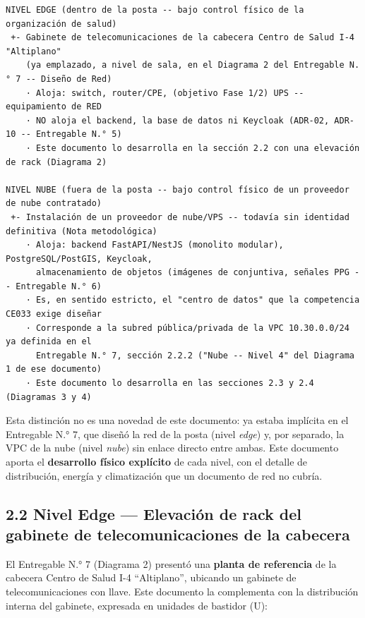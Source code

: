 \documentclass[11pt,a4paper]{article}
\begin{document}
\begin{samepage}\begin{verbatim}
NIVEL EDGE (dentro de la posta -- bajo control físico de la organización de salud)
 +- Gabinete de telecomunicaciones de la cabecera Centro de Salud I-4 "Altiplano"
    (ya emplazado, a nivel de sala, en el Diagrama 2 del Entregable N.° 7 -- Diseño de Red)
    · Aloja: switch, router/CPE, (objetivo Fase 1/2) UPS -- equipamiento de RED
    · NO aloja el backend, la base de datos ni Keycloak (ADR-02, ADR-10 -- Entregable N.° 5)
    · Este documento lo desarrolla en la sección 2.2 con una elevación de rack (Diagrama 2)

NIVEL NUBE (fuera de la posta -- bajo control físico de un proveedor de nube contratado)
 +- Instalación de un proveedor de nube/VPS -- todavía sin identidad definitiva (Nota metodológica)
    · Aloja: backend FastAPI/NestJS (monolito modular), PostgreSQL/PostGIS, Keycloak,
      almacenamiento de objetos (imágenes de conjuntiva, señales PPG -- Entregable N.° 6)
    · Es, en sentido estricto, el "centro de datos" que la competencia CE033 exige diseñar
    · Corresponde a la subred pública/privada de la VPC 10.30.0.0/24 ya definida en el
      Entregable N.° 7, sección 2.2.2 ("Nube -- Nivel 4" del Diagrama 1 de ese documento)
    · Este documento lo desarrolla en las secciones 2.3 y 2.4 (Diagramas 3 y 4)
\end{verbatim}\end{samepage}

Esta distinción no es una novedad de este documento: ya estaba implícita en el Entregable N.° 7, que diseñó la red de la posta (nivel \emph{edge}) y, por separado, la VPC de la nube (nivel \emph{nube}) sin enlace directo entre ambas. Este documento aporta el \textbf{desarrollo físico explícito} de cada nivel, con el detalle de distribución, energía y climatización que un documento de red no cubría.

\subsection{2.2 Nivel Edge --- Elevación de rack del gabinete de telecomunicaciones de la cabecera}\label{nivel-edge-elevaciuxf3n-de-rack-del-gabinete-de-telecomunicaciones-de-la-cabecera}

El Entregable N.° 7 (Diagrama 2) presentó una \textbf{planta de referencia} de la cabecera Centro de Salud I-4 ``Altiplano'', ubicando un gabinete de telecomunicaciones con llave. Este documento la complementa con la distribución interna del gabinete, expresada en unidades de bastidor (U):
\end{document}
